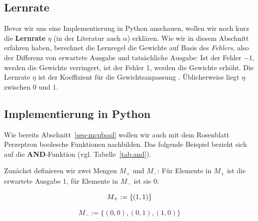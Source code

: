 \subsection*{Lernrate}
Bevor wir uns eine Implementierung in Python anschauen, wollen wir noch kurz die \textbf{Lernrate} $\eta$ (in der Literatur auch $\alpha$) erklären.
Wie wir in diesem Abschnitt erfahren haben, berechnet die Lernregel die Gewichte auf Basis des \textit{Fehlers}, also der Differenz von $\text{erwartete Ausgabe}$ und $\text{tatsächliche Ausgabe}$: Ist der Fehler $-1$, werden die Gewichte verringert, ist der Fehler 1, werden die Gewichte erhöht.
Die Lernrate $\eta$ ist der Koeffizient für die Gewichtsanpassung \footnotemark[31].
Üblicherweise liegt $\eta$ zwischen $0$ und $1$\footnotemark[32] [Fau94:61].



\subsection{Implementierung in Python}

Wie bereits Abschnitt~\ref{seq-mcpbool} wollen wir auch mit dem Rosenblatt Perzeptron boolesche Funktionen nachbilden.
Das folgende Beispiel bezieht sich auf die \textbf{AND}-Funktion (vgl. Tabelle~\ref{tab:and}).

Zunächst definieren wir zwei Mengen $M_+$ und $M_-$: Für Elemente in $M_+$ ist die erwartete Ausgabe $1$, für Elemente in $M_-$ ist sie $0$:

\begin{equation}
M_+ := \{(1, 1)\}\\
\end{equation}

\begin{equation}
M_- := \{(0, 0), (0,1), (1,0)\}
\end{equation}

